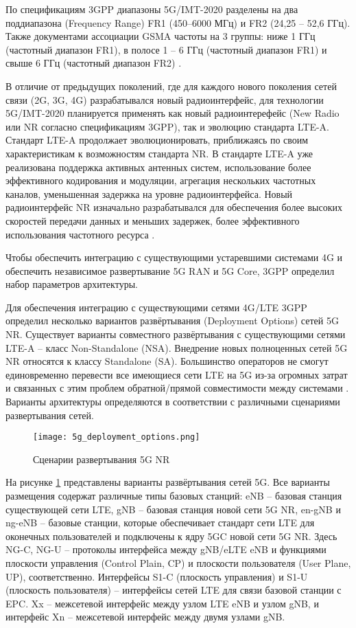 По спецификациям 3GPP диапазоны 5G/IMT-2020 разделены на два поддиапазона (Frequency Range) FR1 (450–6000 МГц) и FR2 (24,25 – 52,6 ГГц). Также документами ассоциации GSMA частоты на 3 группы: ниже 1 ГГц (частотный диапазон FR1), в полосе 1 – 6 ГГц (частотный диапазон FR1) и свыше 6 ГГц (частотный диапазон FR2) \cite{prikaz_minkomsvyazi_5G_IMT-2020}.

В отличие от предыдущих поколений, где для каждого нового поколения сетей связи (2G, 3G, 4G) разрабатывался новый радиоинтерфейс, для технологии 5G/IMT-2020 планируется применять как новый радиоинтерефейс (New Radio или NR согласно спецификациям 3GPP), так и эволюцию стандарта LTE-A. Стандарт LTE-A продолжает эволюционировать, приближаясь по своим характеристикам к возможностям стандарта NR. В стандарте LTE-A уже реализована поддержка активных антенных систем, использование более эффективного кодирования и модуляции, агрегация нескольких частотных каналов, уменьшенная задержка на уровне радиоинтерфейса. Новый радиоинтерфейс NR изначально разрабатывался для обеспечения более высоких скоростей передачи данных и меньших задержек, более эффективного использования частотного ресурса \cite{prikaz_minkomsvyazi_5G_IMT-2020}.

Чтобы обеспечить интеграцию с существующими устаревшими системами 4G и обеспечить независимое развертывание 5G RAN и 5G Core, 3GPP определил набор параметров архитектуры.

Для обеспечения интеграцию с существующими сетями 4G/LTE 3GPP определил несколько вариантов развёртывания (Deployment Options) сетей 5G NR.  Существует варианты совместного развёртывания с существующими сетями LTE-A -- класс Non-Standalone (NSA). Внедрение новых полноценных сетей 5G NR относятся к классу Standalone (SA). Большинство операторов не смогут единовременно перевести все имеющиеся сети LTE на 5G  из-за огромных затрат и связанных с этим проблем обратной/прямой совместимости между системами \cite{Teral2019,Kibria2018,Liu2020, ElRhayour2019}.  Варианты архитектуры определяются в соответствии с различными сценариями развертывания сетей. 

\begin{figure}[h!]
  \centering
   \texttt{[image: 5g\_deployment\_options.png]}
\caption{Сценарии развертывания 5G NR}
\label{fig:part1_5g_deployment_options}
\end{figure}

На рисунке \cref{fig:part1_5g_deployment_options} представлены варианты развёртывания сетей 5G. Все варианты размещения содержат различные типы базовых станций: eNB -- базовая станция существующей сети LTE, gNB -- базовая станция новой сети 5G NR,  en-gNB и ng-eNB -- базовые станции, которые обеспечивает стандарт сети LTE для оконечных пользователей и подключены к ядру 5GC новой сети 5G NR. Здесь NG-C, NG-U -- протоколы интерфейса между gNB/eLTE eNB и функциями  плоскости управления (Control Plain, CP) и плоскости пользователя (User Plane, UP), соответственно. Интерфейсы S1-C (плоскость управления) и S1-U (плоскость пользователя) -- интерфейсы сетей LTE для связи базовой станции с EPC. Xx -- межсетевой интерфейс между узлом LTE eNB и узлом gNB, и интерфейс Xn -- межсетевой интерфейс между двумя узлами gNB.

